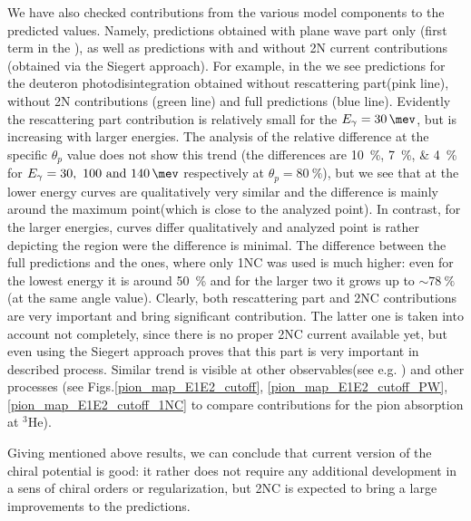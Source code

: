 We have also checked contributions from the various model components to the predicted values.
Namely, predictions obtained with plane wave part only (first term in the ),
as well as predictions with and without 2N current contributions (obtained via the Siegert approach).
For example, in the  we see predictions for the deuteron photodisintegration obtained 
without rescattering part(pink line), without 2N contributions (green line) and full predictions (blue line).
Evidently the rescattering part contribution is relatively small for the $E_\gamma = \SI{30}{\mev}$,
but is increasing with larger energies. The analysis of the relative difference at the specific 
$\theta_p$ value does not show this trend (the differences are \SIlist{10;7;4}{\percent} 
for $E_\gamma=\SIlist[list-units = single]{30;100;140}{\mev}$ respectively at $\theta_p=\SI{80}{\percent}$), but we see that
at the lower energy curves are qualitatively very similar and the difference is mainly around the maximum point(which is close to the analyzed point).
In contrast, for the larger energies, curves differ qualitatively and analyzed point is rather depicting the region
were the difference is minimal.
The difference between the full predictions and the ones, where only 1NC was used is much higher:
even for the lowest energy it is around \SI{50}{\percent} and for the larger two it grows
up to $\sim\SI{78}{\percent}$ (at the same angle value).
Clearly, both rescattering part and 2NC contributions are very important and bring significant contribution.
The latter one is taken into account not completely, since there is no proper 2NC current 
available yet, but even using the Siegert approach proves that this part is very important in described process.
Similar trend is visible at other observables(see e.g. ) and other processes 
(see Figs.\ref{pion_map_E1E2_cutoff}, \ref{pion_map_E1E2_cutoff_PW}, \ref{pion_map_E1E2_cutoff_1NC}
to compare contributions for the pion absorption at $^3$He).

Giving mentioned above results, we can conclude that current version of the chiral potential is good:
it rather does not require any additional development in a sens of chiral orders or regularization,
but 2NC is expected to bring a large improvements to the predictions.